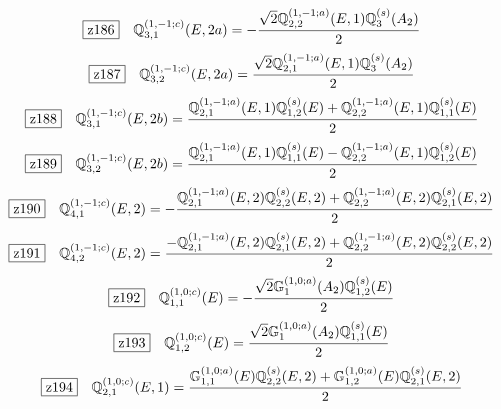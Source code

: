 \documentclass[fleqn,10pt,landscape]{jsarticle}
\begin{document}
\begin{dmath*}
\hspace*{3mm}\fbox{z186}\quad \mathbb{Q}_{3,1}^{(1,-1;c)}(E,2a)=- \frac{\sqrt{2} \mathbb{Q}_{2,2}^{(1,-1;a)}(E,1) \mathbb{Q}_{3}^{(s)}(A_{2})}{2}
\end{dmath*}
\begin{dmath*}
\hspace*{3mm}\fbox{z187}\quad \mathbb{Q}_{3,2}^{(1,-1;c)}(E,2a)=\frac{\sqrt{2} \mathbb{Q}_{2,1}^{(1,-1;a)}(E,1) \mathbb{Q}_{3}^{(s)}(A_{2})}{2}
\end{dmath*}
\begin{dmath*}
\hspace*{3mm}\fbox{z188}\quad \mathbb{Q}_{3,1}^{(1,-1;c)}(E,2b)=\frac{\mathbb{Q}_{2,1}^{(1,-1;a)}(E,1) \mathbb{Q}_{1,2}^{(s)}(E) + \mathbb{Q}_{2,2}^{(1,-1;a)}(E,1) \mathbb{Q}_{1,1}^{(s)}(E)}{2}
\end{dmath*}
\begin{dmath*}
\hspace*{3mm}\fbox{z189}\quad \mathbb{Q}_{3,2}^{(1,-1;c)}(E,2b)=\frac{\mathbb{Q}_{2,1}^{(1,-1;a)}(E,1) \mathbb{Q}_{1,1}^{(s)}(E) - \mathbb{Q}_{2,2}^{(1,-1;a)}(E,1) \mathbb{Q}_{1,2}^{(s)}(E)}{2}
\end{dmath*}
\begin{dmath*}
\hspace*{3mm}\fbox{z190}\quad \mathbb{Q}_{4,1}^{(1,-1;c)}(E,2)=- \frac{\mathbb{Q}_{2,1}^{(1,-1;a)}(E,2) \mathbb{Q}_{2,2}^{(s)}(E,2) + \mathbb{Q}_{2,2}^{(1,-1;a)}(E,2) \mathbb{Q}_{2,1}^{(s)}(E,2)}{2}
\end{dmath*}
\begin{dmath*}
\hspace*{3mm}\fbox{z191}\quad \mathbb{Q}_{4,2}^{(1,-1;c)}(E,2)=\frac{- \mathbb{Q}_{2,1}^{(1,-1;a)}(E,2) \mathbb{Q}_{2,1}^{(s)}(E,2) + \mathbb{Q}_{2,2}^{(1,-1;a)}(E,2) \mathbb{Q}_{2,2}^{(s)}(E,2)}{2}
\end{dmath*}
\begin{dmath*}
\hspace*{3mm}\fbox{z192}\quad \mathbb{Q}_{1,1}^{(1,0;c)}(E)=- \frac{\sqrt{2} \mathbb{G}_{1}^{(1,0;a)}(A_{2}) \mathbb{Q}_{1,2}^{(s)}(E)}{2}
\end{dmath*}
\begin{dmath*}
\hspace*{3mm}\fbox{z193}\quad \mathbb{Q}_{1,2}^{(1,0;c)}(E)=\frac{\sqrt{2} \mathbb{G}_{1}^{(1,0;a)}(A_{2}) \mathbb{Q}_{1,1}^{(s)}(E)}{2}
\end{dmath*}
\begin{dmath*}
\hspace*{3mm}\fbox{z194}\quad \mathbb{Q}_{2,1}^{(1,0;c)}(E,1)=\frac{\mathbb{G}_{1,1}^{(1,0;a)}(E) \mathbb{Q}_{2,2}^{(s)}(E,2) + \mathbb{G}_{1,2}^{(1,0;a)}(E) \mathbb{Q}_{2,1}^{(s)}(E,2)}{2}
\end{dmath*}
\end{document}
